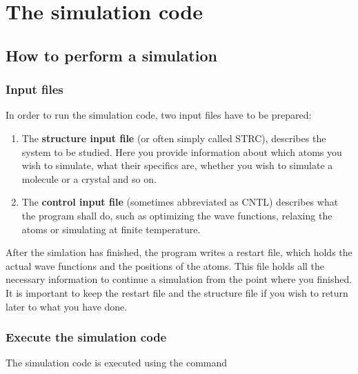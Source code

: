 \documentclass[final,12pt,makeidx,DIV=calc]{article}
\begin{document}
\section{The simulation code}

\subsection{How to perform a simulation}

\subsubsection{Input files}

In order to run the simulation code, two input files have to be
prepared:

\begin{enumerate}
\item The \textbf{structure input file} (or often simply called STRC),
  describes the system to be studied. Here you provide information
  about which atoms you wish to simulate, what their specifics are,
  whether you wish to simulate a molecule or a crystal and so on.
\item The \textbf{control input file} (sometimes abbreviated as CNTL)
  describes what the program shall do, such as optimizing the wave
  functions, relaxing the atoms or simulating at finite temperature.
\end{enumerate}

After the simlation has finished, the program writes a restart file, which
holds the actual wave functions and the positions of the atoms. This
file holds all the necessary information to continue a simulation from
the point where you finished.  It is important to keep the restart file
and the structure file if you wish to return later to what you have
done. 

\subsubsection{Execute the simulation code}

The simulation code is executed using the command

\bigskip{}\bigskip
\end{document}
